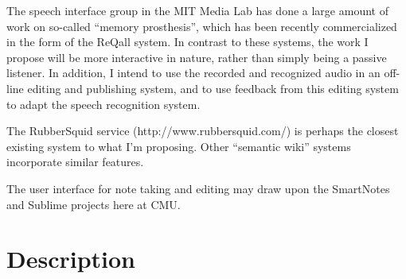 \documentclass{article}
\begin{document}
The speech interface group in the MIT Media Lab has done a large
amount of work on so-called ``memory prosthesis'', which has been
recently commercialized in the form of the ReQall system.  In contrast
to these systems, the work I propose will be more interactive in
nature, rather than simply being a passive listener.  In addition, I
intend to use the recorded and recognized audio in an off-line editing
and publishing system, and to use feedback from this editing system to
adapt the speech recognition system.

The RubberSquid service (http://www.rubbersquid.com/) is perhaps the
closest existing system to what I'm proposing.  Other ``semantic
wiki'' systems incorporate similar features.

The user interface for note taking and editing may draw upon the
SmartNotes and Sublime projects here at CMU.

\section{Description}
\label{sec:description}
\end{document}
